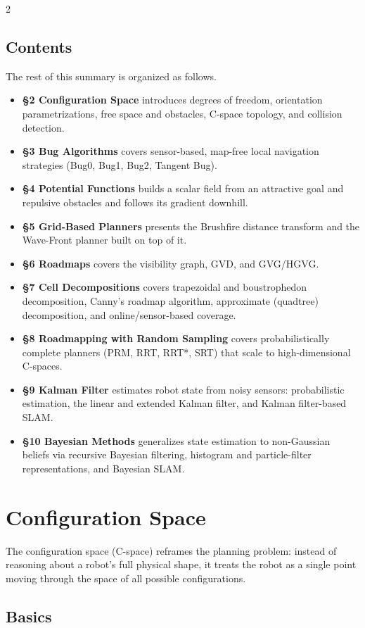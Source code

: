 \documentclass[10pt,a4paper]{article}
\begin{document}
\begin{multicols}{2}
\subsection{Contents}
The rest of this summary is organized as follows.
\begin{itemize}
\item \textbf{\S2 Configuration Space} introduces degrees of freedom, orientation parametrizations, free space and obstacles, C-space topology, and collision detection.
\item \textbf{\S3 Bug Algorithms} covers sensor-based, map-free local navigation strategies (Bug0, Bug1, Bug2, Tangent Bug).
\item \textbf{\S4 Potential Functions} builds a scalar field from an attractive goal and repulsive obstacles and follows its gradient downhill.
\item \textbf{\S5 Grid-Based Planners} presents the Brushfire distance transform and the Wave-Front planner built on top of it.
\item \textbf{\S6 Roadmaps} covers the visibility graph, GVD, and GVG/HGVG.
\item \textbf{\S7 Cell Decompositions} covers trapezoidal and boustrophedon decomposition, Canny's roadmap algorithm, approximate (quadtree) decomposition, and online/sensor-based coverage.
\item \textbf{\S8 Roadmapping with Random Sampling} covers probabilistically complete planners (PRM, RRT, RRT*, SRT) that scale to high-dimensional C-spaces.
\item \textbf{\S9 Kalman Filter} estimates robot state from noisy sensors: probabilistic estimation, the linear and extended Kalman filter, and Kalman filter-based SLAM.
\item \textbf{\S10 Bayesian Methods} generalizes state estimation to non-Gaussian beliefs via recursive Bayesian filtering, histogram and particle-filter representations, and Bayesian SLAM.
\end{itemize}

\section{Configuration Space}

The configuration space (C-space) reframes the planning problem: instead of reasoning about a robot's full physical shape, it treats the robot as a single point moving through the space of all possible configurations.

\subsection{Basics}


\end{multicols}
\end{document}
